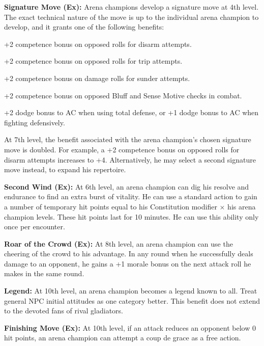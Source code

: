 {\textbf{Signature Move (Ex):} Arena champions develop a signature move at 4th level. The exact technical nature of the move is up to the individual arena champion to develop, and it grants one of the following benefits:
\begin{itemize*}
\item +2 competence bonus on opposed rolls for disarm attempts.
\item +2 competence bonus on opposed rolls for trip attempts.
\item +2 competence bonus on damage rolls for sunder attempts.
\item +2 competence bonus on opposed Bluff and Sense Motive checks in combat.
\item +2 dodge bonus to AC when using total defense, or +1 dodge bonus to AC when fighting defensively.
\end{itemize*}

At 7th level, the benefit associated with the arena champion's chosen signature move is doubled. For example, a +2 competence bonus on opposed rolls for disarm attempts increases to +4. Alternatively, he may select a second signature move instead, to expand his repertoire.

\textbf{Second Wind (Ex):} At 6th level, an arena champion can dig his resolve and endurance to find an extra burst of vitality. He can use a standard action to gain a number of temporary hit points equal to his Constitution modifier $\times$ his arena champion levels. These hit points last for 10 minutes. He can use this ability only once per encounter.

\textbf{Roar of the Crowd (Ex):} At 8th level, an arena champion can use the cheering of the crowd to his advantage. In any round when he successfully deals damage to an opponent, he gains a +1 morale bonus on the next attack roll he makes in the same round.

\textbf{Legend:} At 10th level, an arena champion becomes a legend known to all. Treat general NPC initial attitudes as one category better. This benefit does not extend to the devoted fans of rival gladiators.

\textbf{Finishing Move (Ex):} At 10th level, if an attack reduces an opponent below 0 hit points, an arena champion can attempt a coup de grace as a free action.
}